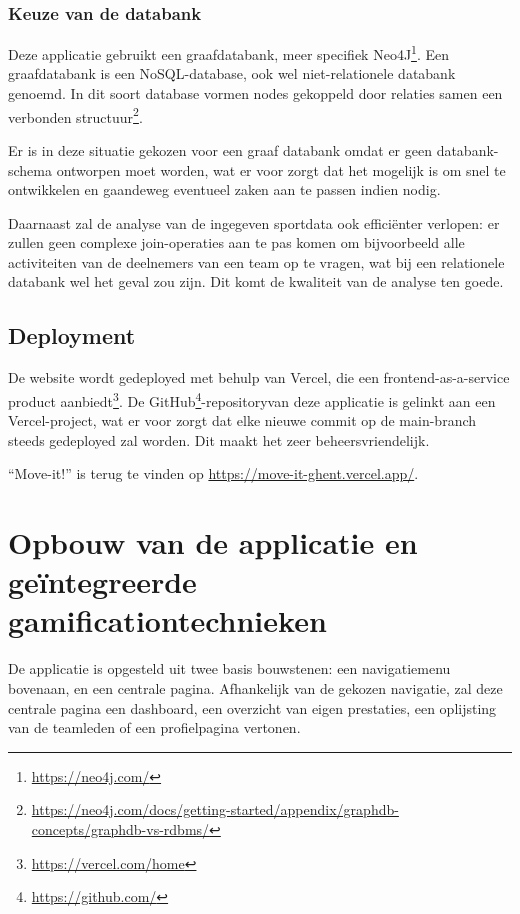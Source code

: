 \subsubsection{Keuze van de databank}

Deze applicatie gebruikt een graafdatabank, meer specifiek Neo4J\footnote{\href{https://neo4j.com/}{https://neo4j.com/}}.
Een graafdatabank is een NoSQL-database, ook wel niet-relationele databank genoemd. In dit soort database vormen nodes gekoppeld door relaties samen een verbonden  structuur\footnote{\href{https://neo4j.com/docs/getting-started/appendix/graphdb-concepts/graphdb-vs-rdbms/}{https://neo4j.com/docs/getting-started/appendix/graphdb-concepts/graphdb-vs-rdbms/}}.

Er is in deze situatie gekozen voor een graaf databank omdat er geen databank-schema ontworpen moet worden, wat er voor zorgt dat het mogelijk is om snel te ontwikkelen en gaandeweg eventueel zaken aan te passen indien nodig.

Daarnaast zal de analyse van de ingegeven sportdata ook efficiënter verlopen: er zullen geen complexe join-operaties aan te pas komen om bijvoorbeeld alle activiteiten van de deelnemers van een team op te vragen, wat bij een relationele databank wel het geval zou zijn. Dit komt de kwaliteit van de analyse ten goede.

\subsection{Deployment}

De website wordt gedeployed met behulp van Vercel, die een frontend-as-a-service product aanbiedt\footnote{\href{https://vercel.com/home}{https://vercel.com/home}}. De GitHub\footnote{\href{https://github.com/}{https://github.com/}}-repositoryvan deze applicatie is gelinkt aan een Vercel-project, wat er voor zorgt dat elke nieuwe commit op de main-branch steeds gedeployed zal worden. Dit maakt het zeer beheersvriendelijk.

``Move-it!'' is terug te vinden op \href{https://move-it-ghent.vercel.app/}{https://move-it-ghent.vercel.app/}.

\section{Opbouw van de applicatie en geïntegreerde gamificationtechnieken}

De applicatie is opgesteld uit twee basis bouwstenen: een navigatiemenu bovenaan, en een centrale pagina. Afhankelijk van de gekozen navigatie, zal deze centrale pagina een dashboard, een overzicht van eigen prestaties, een oplijsting van de teamleden of een profielpagina vertonen.

